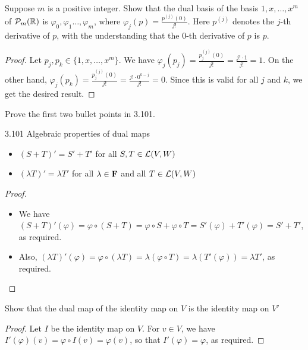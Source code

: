 \begin{exercise}{7}
  Suppose $m$ is a positive integer. Show that the dual basis of the basis $1,x,\dots,x^m$ of $\mathcal{P}_m(\mathbb{R})$ is $\varphi_0,\varphi_1\dots,\varphi_m$, where $\varphi_j(p)=\frac{p^{(j)}(0)}{j!}$. Here $p^{(j)}$ denotes the $j$-th derivative of $p$, with the understanding that the $0$-th derivative of $p$ is $p$.
\end{exercise}
\begin{proof}
 Let $p_j, p_k\in\{1,x,\dots,x^m\}$. We have $\varphi_j(p_j)= \frac{p_j^{(j)}(0)}{j!}= \frac{j!\cdot 1}{j!}= 1$. On the other hand, $\varphi_j(p_k)= \frac{p_j^{(j)}(0)}{j!}= \frac{j!\cdot 0^{k-j}}{j!}= 0$. Since this is valid for all $j$ and $k$, we get the desired result.
\end{proof}

\begin{exercise}{10}
  Prove the first two bullet points in 3.101.

  3.101 Algebraic properties of dual maps

  \begin{itemize}
      \item $(S+T)'=S'+T'$ for all $S,T\in\mathcal{L}(V,W)$
      \item $(\lambda T)'=\lambda T'$ for all $\lambda\in\mathbf{F}$ and all $T\in\mathcal{L}(V,W)$
  \end{itemize}
\end{exercise}
\begin{proof}
 \begin{itemize}
     \item We have $(S+T)'(\varphi)= \varphi\circ(S+T)= \varphi\circ S + \varphi\circ T= S'(\varphi)+T'(\varphi)= S'+T'$, as required.
     \item Also, $(\lambda T)'(\varphi)= \varphi\circ(\lambda T)= \lambda(\varphi\circ T)= \lambda(T'(\varphi))= \lambda T'$, as required.
 \end{itemize}
\end{proof}

\begin{exercise}{12}
  Show that the dual map of the identity map on $V$ is the identity map on $V'$
\end{exercise}
\begin{proof}
 Let $I$ be the identity map on $V$. For $v\in V$, we have $I'(\varphi)(v)=\varphi\circ I(v)= \varphi(v)$, so that $I'(\varphi)=\varphi$, as required.
\end{proof}

